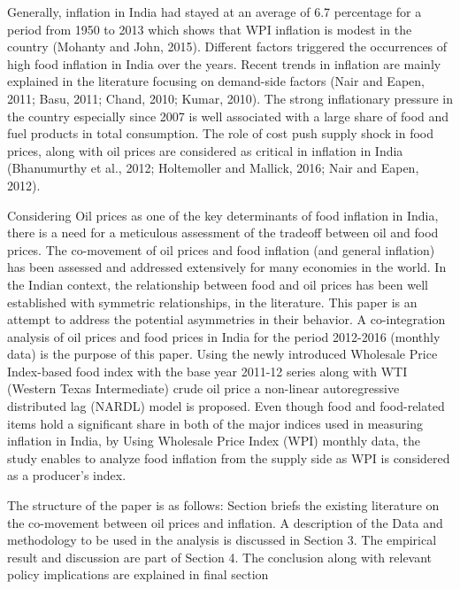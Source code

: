 \documentclass[a4paper,12pt]{article}
\begin{document}
Generally, inflation in India had stayed at an average of 6.7 percentage for a period from 1950 to 2013 which shows that WPI inflation is modest in the country (Mohanty and John, 2015). Different factors triggered the occurrences of high food inflation in India over the years. Recent trends in inflation are mainly explained in the literature focusing on demand-side factors (Nair and Eapen, 2011; Basu, 2011; Chand, 2010; Kumar, 2010). The strong inflationary pressure in the country especially since 2007 is well associated with a large share of food and fuel products in total consumption. The role of cost push supply shock in food prices, along with oil prices are considered as critical in inflation in India (Bhanumurthy et al., 2012; Holtemoller and Mallick, 2016; Nair and Eapen, 2012).

Considering Oil prices as one of the key determinants of food inflation in India, there is a need for a meticulous assessment of the tradeoff between oil and food prices. The co-movement of oil prices and food inflation (and general inflation) has been assessed and addressed extensively for many economies in the world. In the Indian context, the relationship between food and oil prices has been well established with symmetric relationships, in the literature. This paper is an attempt to address the potential asymmetries in their behavior. A co-integration analysis of oil prices and food prices in India for the period 2012-2016 (monthly data) is the purpose of this paper. Using the newly introduced Wholesale Price Index-based food index with the base year 2011-12 series along with WTI (Western Texas Intermediate) crude oil price a non-linear autoregressive distributed lag (NARDL) model is proposed. Even though food and food-related items hold a significant share in both of the major indices used in measuring inflation in India, by Using Wholesale Price Index (WPI) monthly data, the study enables to analyze food inflation from the supply side as WPI is considered as a producer’s index.

The structure of the paper is as follows: Section briefs the existing literature on the co-movement between oil prices and inflation. A description of the Data and methodology to be used in the analysis is discussed in Section 3. The empirical result and discussion are part of Section 4. The conclusion along with relevant policy implications are explained in final section
\end{document}
